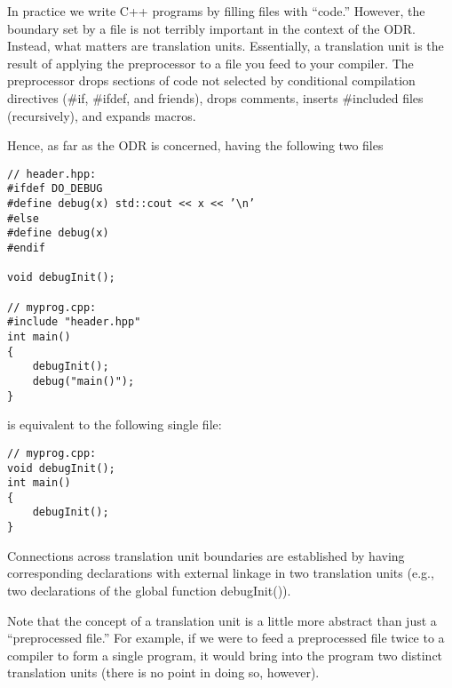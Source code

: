 In practice we write C++ programs by filling files with “code.” However, the boundary set by a file is not terribly important in the context of the ODR. Instead, what matters are translation units. Essentially, a translation unit is the result of applying the preprocessor to a file you feed to your compiler. The preprocessor drops sections of code not selected by conditional compilation directives (\#if, \#ifdef, and friends), drops comments, inserts \#included files (recursively), and expands macros.

Hence, as far as the ODR is concerned, having the following two files

\begin{lstlisting}[style=styleCXX]
// header.hpp:
#ifdef DO_DEBUG
#define debug(x) std::cout << x << ’\n’
#else
#define debug(x)
#endif

void debugInit();

// myprog.cpp:
#include "header.hpp"
int main()
{
	debugInit();
	debug("main()");
}
\end{lstlisting}

is equivalent to the following single file:

\begin{lstlisting}[style=styleCXX]
// myprog.cpp:
void debugInit();
int main()
{
	debugInit();
}
\end{lstlisting}

Connections across translation unit boundaries are established by having corresponding declarations with external linkage in two translation units (e.g., two declarations of the global function debugInit()).

Note that the concept of a translation unit is a little more abstract than just a “preprocessed file.” For example, if we were to feed a preprocessed file twice to a compiler to form a single program, it would bring into the program two distinct translation units (there is no point in doing so, however).









































